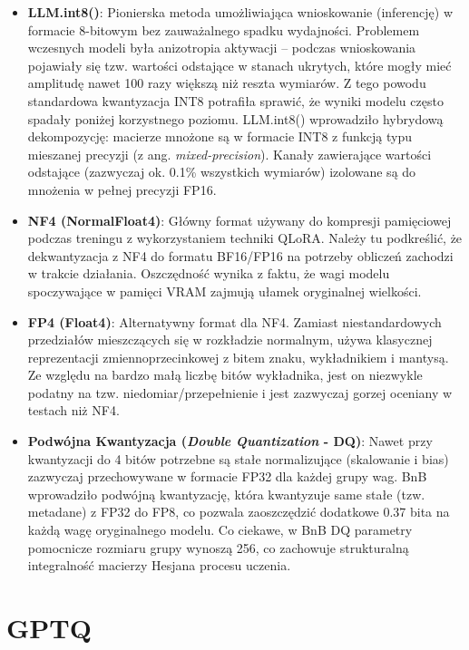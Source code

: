 \begin{itemize}
    \item \textbf{LLM.int8()}: Pionierska metoda umożliwiająca wnioskowanie (inferencję) w formacie 8-bitowym bez zauważalnego spadku wydajności. Problemem wczesnych modeli była anizotropia aktywacji – podczas wnioskowania pojawiały się tzw. wartości odstające w stanach ukrytych, które mogły mieć amplitudę nawet 100 razy większą niż reszta wymiarów. Z tego powodu standardowa kwantyzacja INT8 potrafiła sprawić, że wyniki modelu często spadały poniżej korzystnego poziomu. LLM.int8() wprowadziło hybrydową dekompozycję: macierze mnożone są w formacie INT8 z funkcją typu mieszanej precyzji (z ang. \textit{mixed-precision}). Kanały zawierające wartości odstające (zazwyczaj ok. 0.1\% wszystkich wymiarów) izolowane są do mnożenia w pełnej precyzji FP16.
    
    \item \textbf{NF4 (NormalFloat4)}: Główny format używany do kompresji pamięciowej podczas treningu z wykorzystaniem techniki QLoRA. Należy tu podkreślić, że dekwantyzacja z NF4 do formatu BF16/FP16 na potrzeby obliczeń zachodzi w trakcie działania. Oszczędność wynika z faktu, że wagi modelu spoczywające w pamięci VRAM zajmują ułamek oryginalnej wielkości.
    
    \item \textbf{FP4 (Float4)}: Alternatywny format dla NF4. Zamiast niestandardowych przedziałów mieszczących się w rozkładzie normalnym, używa klasycznej reprezentacji zmiennoprzecinkowej z bitem znaku, wykładnikiem i mantysą. Ze względu na bardzo małą liczbę bitów wykładnika, jest on niezwykle podatny na tzw. niedomiar/przepełnienie i jest zazwyczaj gorzej oceniany w testach niż NF4.
    
    \item \textbf{Podwójna Kwantyzacja (\textit{Double Quantization} - DQ)}: Nawet przy kwantyzacji do 4 bitów potrzebne są stałe normalizujące (skalowanie i bias) zazwyczaj przechowywane w formacie FP32 dla każdej grupy wag. BnB wprowadziło podwójną kwantyzację, która kwantyzuje same stałe (tzw. metadane) z FP32 do FP8, co pozwala zaoszczędzić dodatkowe 0.37 bita na każdą wagę oryginalnego modelu. Co ciekawe, w BnB DQ parametry pomocnicze rozmiaru grupy wynoszą 256, co zachowuje strukturalną integralność macierzy Hesjana procesu uczenia.
\end{itemize}

\section{GPTQ}

